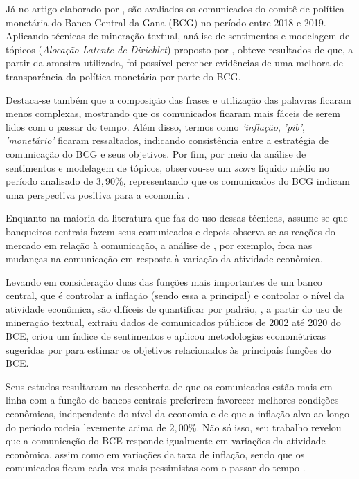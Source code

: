 Já no artigo elaborado por , são avaliados os comunicados do comitê de política monetária do Banco Central da Gana (BCG) no período entre 2018 e 2019. Aplicando técnicas de mineração textual, análise de sentimentos e modelagem de tópicos (\textit{Alocação Latente de Dirichlet}) proposto por , obteve resultados de que, a partir da amostra utilizada, foi possível perceber evidências de uma melhora de transparência da política monetária por parte do BCG. 

Destaca-se também que a composição das frases e utilização das palavras ficaram menos complexas, mostrando que os comunicados ficaram mais fáceis de serem lidos com o passar do tempo. Além disso, termos como \textit{'inflação}, \textit{'pib'}, \textit{'monetário'} ficaram ressaltados, indicando consistência entre a estratégia de comunicação do BCG e seus objetivos. Por fim, por meio da análise de sentimentos e modelagem de tópicos, observou-se um \textit{score} líquido médio no período analisado de $3,90$\%, representando que os comunicados do BCG indicam uma perspectiva positiva para a economia \cite{Omotosho2019}.

Enquanto na maioria da literatura que faz do uso dessas técnicas, assume-se que banqueiros centrais fazem seus comunicados e depois observa-se as reações do mercado em relação à comunicação, a análise de , por exemplo, foca nas mudanças na comunicação em resposta à variação da atividade econômica.

Levando em consideração duas das funções mais importantes de um banco central, que é controlar a inflação (sendo essa a principal) e controlar o nível da atividade econômica, são difíceis de quantificar por padrão, , a partir do uso de mineração textual, extraiu dados de comunicados públicos de 2002 até 2020 do BCE, criou um índice de sentimentos e aplicou metodologias econométricas sugeridas por  para estimar os objetivos relacionados às principais funções do BCE. 

Seus estudos resultaram na descoberta de que os comunicados estão mais em linha com a função de bancos centrais preferirem favorecer melhores condições econômicas, independente do nível da economia e de que a inflação alvo ao longo do período rodeia levemente acima de $2,00$\%. Não só isso, seu trabalho revelou que a comunicação do BCE responde igualmente em variações da atividade econômica, assim como em variações da taxa de inflação, sendo que os comunicados ficam cada vez mais pessimistas com o passar do tempo \cite{zahner_J2021}.

